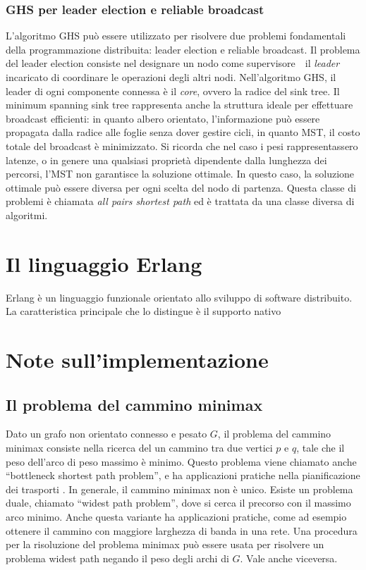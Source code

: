 \documentclass[target=bach,aauheader=,style=]{thud}
\newcommand{\eng}[1]{\foreignlanguage{english}{#1}}
\begin{document}
\subsection{GHS per leader \eng{election} e \eng{reliable broadcast}}
L'algoritmo GHS può essere utilizzato per risolvere due problemi fondamentali della programmazione distribuita: leader \eng{election} e \eng{reliable broadcast}. Il problema del leader \eng{election} consiste nel designare un nodo come supervisore \,\textendash\, il \emph{leader} \,\textendash\, incaricato di coordinare le operazioni degli altri nodi. Nell'algoritmo GHS, il leader di ogni componente connessa è il \emph{core}, ovvero la radice del \eng{sink tree}. Il \eng{minimum spanning sink tree} rappresenta anche la struttura ideale per effettuare \eng{broadcast} efficienti: in quanto albero orientato, l'informazione può essere propagata dalla radice alle foglie senza dover gestire cicli, in quanto MST, il costo totale del \eng{broadcast} è minimizzato. Si ricorda che nel caso i pesi rappresentassero latenze, o in genere una qualsiasi proprietà dipendente dalla lunghezza dei percorsi, l'MST non garantisce la soluzione ottimale. In questo caso, la soluzione ottimale può essere diversa per ogni scelta del nodo di partenza. Questa classe di problemi è chiamata \eng{\emph{all pairs shortest path}} ed è trattata da una classe diversa di algoritmi.


\chapter{Il linguaggio Erlang}

Erlang è un linguaggio funzionale orientato allo sviluppo di software distribuito. La caratteristica principale che lo distingue è il supporto nativo 

\chapter{Note sull'implementazione}

\section{Il problema del cammino minimax}

Dato un grafo non orientato connesso e pesato $G$, il problema del cammino minimax consiste nella ricerca del un cammino tra due vertici $p$ e $q$, tale che il peso dell'arco di peso massimo è minimo. Questo problema viene chiamato anche ``\eng{bottleneck shortest path problem}'', e ha applicazioni pratiche nella pianificazione dei trasporti \cite{doi:10.1287/trsc.21.2.115}. In generale, il cammino minimax non è unico. Esiste un problema duale, chiamato ``\eng{widest path problem}'', dove si cerca il precorso con il massimo arco minimo. Anche questa variante ha applicazioni pratiche, come ad esempio ottenere il cammino con maggiore larghezza di banda in una rete. Una procedura per la risoluzione del problema minimax può essere usata per risolvere un problema \eng{widest path} negando il peso degli archi di $G$. Vale anche viceversa.
\end{document}
